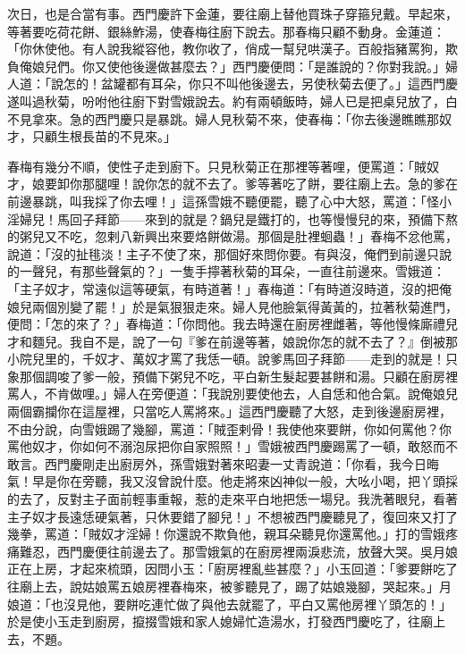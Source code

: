 次日，也是合當有事。西門慶許下金蓮，要往廟上替他買珠子穿箍兒戴。早起來，等著要吃荷花餅、銀絲鮓湯，使春梅往廚下說去。那春梅只顧不動身。金蓮道：「你休使他。有人說我縱容他，教你收了，俏成一幫兒哄漢子。百般指豬罵狗，欺負俺娘兒們。你又使他後邊做甚麼去？」西門慶便問：「是誰說的？你對我說。」婦人道：「說怎的！盆罐都有耳朵，你只不叫他後邊去，另使秋菊去便了。」這西門慶遂叫過秋菊，吩咐他往廚下對雪娥說去。約有兩頓飯時，婦人已是把桌兒放了，白不見拿來。急的西門慶只是暴跳。婦人見秋菊不來，使春梅：「你去後邊瞧瞧那奴才，只顧生根長苗的不見來。」

春梅有幾分不順，使性子走到廚下。只見秋菊正在那裡等著哩，便罵道：「賊奴才，娘要卸你那腿哩！說你怎的就不去了。爹等著吃了餅，要往廟上去。急的爹在前邊暴跳，叫我採了你去哩！」這孫雪娥不聽便罷，聽了心中大怒，罵道：「怪小淫婦兒！馬回子拜節——來到的就是？鍋兒是鐵打的，也等慢慢兒的來，預備下熬的粥兒又不吃，忽剌八新興出來要烙餅做湯。那個是肚裡蛔蟲！」春梅不忿他罵，說道：「沒的扯毴淡！主子不使了來，那個好來問你要。有與沒，俺們到前邊只說的一聲兒，有那些聲氣的？」一隻手擰著秋菊的耳朵，一直往前邊來。雪娥道：「主子奴才，常遠似這等硬氣，有時道著！」春梅道：「有時道沒時道，沒的把俺娘兒兩個別變了罷！」於是氣狠狠走來。婦人見他臉氣得黃黃的，拉著秋菊進門，便問：「怎的來了？」春梅道：「你問他。我去時還在廚房裡雌著，等他慢條廝禮兒才和麵兒。我自不是，說了一句『爹在前邊等著，娘說你怎的就不去了？』倒被那小院兒里的，千奴才、萬奴才罵了我恁一頓。說爹馬回子拜節——走到的就是！只象那個調唆了爹一般，預備下粥兒不吃，平白新生髮起要甚餅和湯。只顧在廚房裡罵人，不肯做哩。」婦人在旁便道：「我說別要使他去，人自恁和他合氣。說俺娘兒兩個霸攔你在這屋裡，只當吃人罵將來。」這西門慶聽了大怒，走到後邊廚房裡，不由分說，向雪娥踢了幾腳，罵道：「賊歪剌骨！我使他來要餅，你如何罵他？你罵他奴才，你如何不溺泡尿把你自家照照！」雪娥被西門慶踢罵了一頓，敢怒而不敢言。西門慶剛走出廚房外，孫雪娥對著來昭妻一丈青說道：「你看，我今日晦氣！早是你在旁聽，我又沒曾說什麼。他走將來凶神似一般，大吆小喝，把丫頭採的去了，反對主子面前輕事重報，惹的走來平白地把恁一場兒。我洗著眼兒，看著主子奴才長遠恁硬氣著，只休要錯了腳兒！」不想被西門慶聽見了，復回來又打了幾拳，罵道：「賊奴才淫婦！你還說不欺負他，親耳朵聽見你還罵他。」打的雪娥疼痛難忍，西門慶便往前邊去了。那雪娥氣的在廚房裡兩淚悲流，放聲大哭。吳月娘正在上房，才起來梳頭，因問小玉：「廚房裡亂些甚麼？」小玉回道：「爹要餅吃了往廟上去，說姑娘罵五娘房裡春梅來，被爹聽見了，踢了姑娘幾腳，哭起來。」月娘道：「也沒見他，要餅吃連忙做了與他去就罷了，平白又罵他房裡丫頭怎的！」於是使小玉走到廚房，攛掇雪娥和家人媳婦忙造湯水，打發西門慶吃了，往廟上去，不題。

